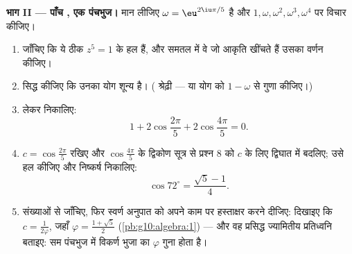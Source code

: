 \begin{problem}
\medskip
\noindent\textbf{भाग II --- पाँच , एक पंचभुज।}
मान लीजिए $\omega = \eu^{2\iu\pi/5}$ है और $1, \omega, \omega^2, \omega^3, \omega^4$ पर विचार कीजिए।
\begin{enumerate}[resume]
  \item जाँचिए कि ये ठीक $z^5 = 1$ के हल हैं, और समतल में वे जो आकृति खींचते हैं
        उसका वर्णन कीजिए।
  \item सिद्ध कीजिए कि उनका योग शून्य है। ( श्रेढ़ी --- या योग को
        $1 - \omega$ से गुणा कीजिए।)
  \item {} लेकर निकालिए:
        \[
        1 + 2\cos\frac{2\pi}{5} + 2\cos\frac{4\pi}{5} = 0 .
        \]
  \item $c = \cos\frac{2\pi}{5}$ रखिए और $\cos\frac{4\pi}{5}$ के द्विकोण सूत्र से प्रश्न 8 को $c$ के लिए
        द्विघात  में बदलिए; उसे हल कीजिए और निष्कर्ष निकालिए:
        \[
        \cos 72^\circ = \frac{\sqrt5 - 1}{4} .
        \]
  \item संख्याओं से जाँचिए, फिर स्वर्ण अनुपात को अपने काम पर हस्ताक्षर करने
        दीजिए: दिखाइए कि $c = \frac{1}{2\varphi}$, जहाँ $\varphi = \frac{1 + \sqrt5}{2}$ (\cref{pb:g10:algebra:1}) --- और वह प्रसिद्ध
        ज्यामितीय प्रतिध्वनि बताइए: सम पंचभुज में विकर्ण भुजा का $\varphi$ गुना
        होता है।
\end{enumerate}


\end{problem}

